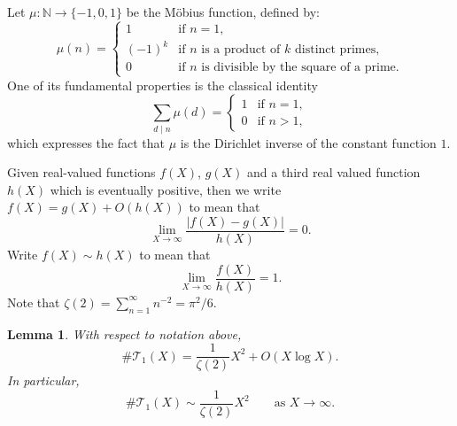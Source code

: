 \documentclass[table]{amsart}
\newtheorem{lemma}[theorem]{Lemma}
\numberwithin{equation}{section}
\begin{document}
\par Let \(\mu:\mathbb{N}\to \{-1,0,1\}\) be the M\"obius function, defined by:
\[
\mu(n)=
\begin{cases}
1 & \text{if } n=1,\\[4pt]
(-1)^k & \text{if } n \text{ is a product of } k \text{ distinct primes},\\[4pt]
0 & \text{if } n \text{ is divisible by the square of a prime}.
\end{cases}
\]
One of its fundamental properties is the classical identity
\begin{equation}\label{mobius identity}
\sum_{d\mid n} \mu(d)=
\begin{cases}
1 & \text{if } n=1,\\
0 & \text{if } n>1,
\end{cases}
\end{equation}
which expresses the fact that \(\mu\) is the Dirichlet inverse of the constant function \(1\). 
 \par Given real-valued functions $f(X)$, $g(X)$ and a third real valued function $h(X)$ which is eventually positive, then we write $f(X)=g(X)+O\left(h(X)\right)$ to mean that \[\lim_{X\rightarrow \infty} \frac{|f(X)-g(X)|}{h(X)}=0.\]
\noindent Write $f(X)\sim h(X)$ to mean that 
\[\lim_{X\rightarrow \infty} \frac{f(X)}{h(X)}=1.\]
\noindent Note that $\zeta(2)=\sum_{n=1}^\infty n^{-2}=\pi^2/6$.
\begin{lemma}\label{lemma on T_1 asymptotic}
    With respect to notation above, 
   \begin{equation}\label{T(X) asymptotic}
       \#\mathcal{T}_1(X) = \frac{1}{\zeta(2)}X^2 + O(X\log X).
   \end{equation}
In particular,
\[
\#\mathcal{T}_1(X) \sim \frac{1}{\zeta(2)}X^2 \qquad \text{as } X\to\infty.
\]
\end{lemma}
\end{document}
